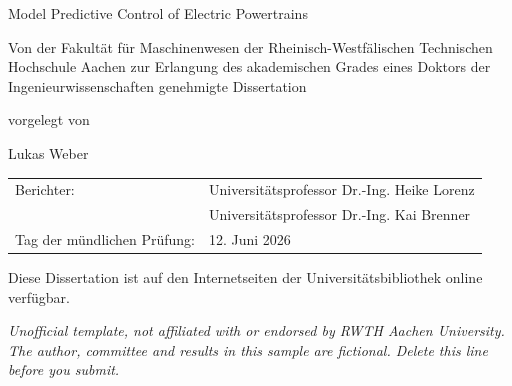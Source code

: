 \begin{titlepage}
\begin{otherlanguage}{ngerman}
\centering
\vspace*{0.6in}
{\LARGE Model Predictive Control of Electric Powertrains\par}
\vspace{1in}
\begin{minipage}{0.85\linewidth}\centering
Von der Fakultät für Maschinenwesen der Rheinisch-Westfälischen Technischen
Hochschule Aachen zur Erlangung des akademischen Grades eines Doktors der Ingenieurwissenschaften
genehmigte Dissertation
\end{minipage}\par
\vspace{0.5in}
vorgelegt von\par
\vspace{0.2in}
Lukas Weber\par
\vspace{1in}
\begin{tabular}{@{}ll@{}}
Berichter: & Universitätsprofessor Dr.-Ing. Heike Lorenz\\
& Universitätsprofessor Dr.-Ing. Kai Brenner\\[0.8em]
Tag der mündlichen Prüfung: & 12. Juni 2026
\end{tabular}\par
\vfill
Diese Dissertation ist auf den Internetseiten der Universitätsbibliothek online verfügbar.\par
\vspace{0.3in}
\end{otherlanguage}
{\footnotesize\itshape Unofficial template, not affiliated with or endorsed by RWTH Aachen University. The author, committee and results in this sample are fictional. Delete this line before you submit.}
\end{titlepage}
